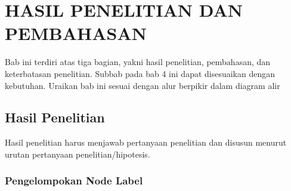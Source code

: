 \chapter{HASIL PENELITIAN DAN PEMBAHASAN}
Bab ini terdiri atas tiga bagian, yakni hasil penelitian, pembahasan, dan keterbatasan penelitian. Subbab pada bab 4 ini dapat disesuaikan dengan kebutuhan. Uraikan bab ini sesuai dengan alur berpikir dalam diagram alir

\section{Hasil Penelitian}
Hasil penelitian harus menjawab pertanyaan penelitian dan disusun menurut urutan pertanyaan penelitian/hipotesis.

\subsection{Pengelompokan Node Label}

